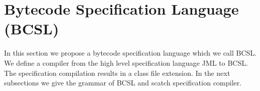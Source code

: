 
\section{Bytecode Specification Language (BCSL)}\label{bcSpecLg}
In this section we propose a bytecode specification language which we call BCSL. We define a compiler from the high level specification language JML to BCSL. The specification compilation results in a class file extension. In the next subsections we give the grammar of BCSL and scatch specification compiler.



